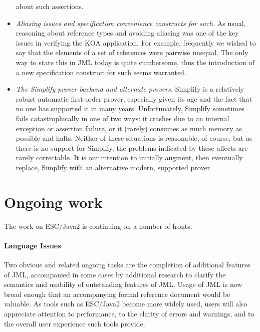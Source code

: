 \documentclass{llncs}
\begin{document}
\begin{itemize}
  about such assertions.
\item \emph{Aliasing issues and specification convenience constructs
    for such.}  As usual, reasoning about reference types and avoiding
  aliasing was one of the key issues in verifying the KOA application.
  For example, frequently we wished to say that the elements of a set
  of references were pairwise unequal.  The only way to state this in
  JML today is quite cumbersome, thus the introduction of a new
  specification construct for such seems warranted.
\item \emph{The Simplify prover backend and alternate provers.}
  Simplify is a relatively robust automatic first-order prover,
  especially given its age and the fact that no one has supported it
  in many years.  Unfortunately, Simplify sometimes fails
  catastrophically in one of two ways: it crashes due to an internal
  exception or assertion failure, or it (rarely) consumes as much
  memory as possible and halts.  Neither of these situations is
  reasonable, of course, but as there is no support for Simplify, the
  problems indicated by these affects are rarely correctable.  It is
  our intention to initially augment, then eventually replace,
  Simplify with an alternative modern, supported prover.
\end{itemize}


\section{Ongoing work}
The work on ESC/Java2 is continuing on a number of fronts.

\paragraph*{Language Issues} Two obvious and related ongoing tasks are
the completion of additional features of JML, accompanied in some
cases by additional research to clarify the semantics and usability of
outstanding features of JML.  Usage of JML is now broad enough that an
accompanying formal reference document would be valuable.  As
tools such as ESC/Java2 become more widely used, users will also
appreciate attention to performance, to the clarity of errors and
warnings, and to the overall user experience such tools provide.
\end{document}
